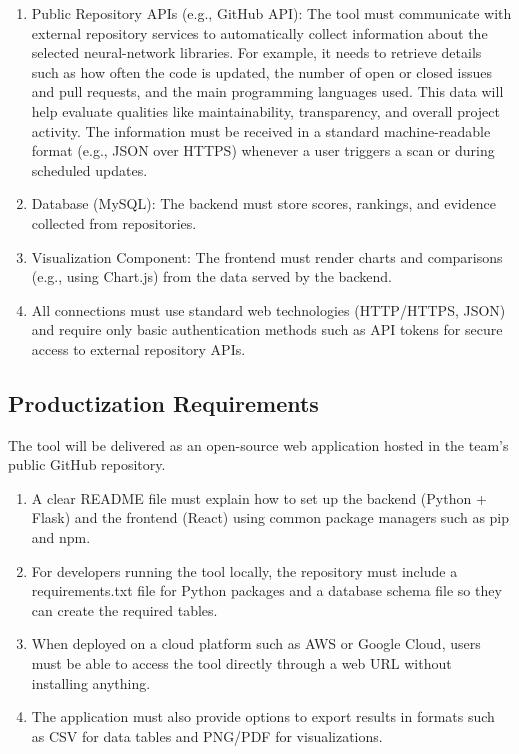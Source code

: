\documentclass[12pt]{article}
\begin{document}
\begin{enumerate}[label=OE-IA\arabic*]

  \item Public Repository APIs (e.g., GitHub API): The tool must communicate with external repository services to automatically collect information about the selected neural-network libraries. For example, it needs to retrieve details such as how often the code is updated, the number of open or closed issues and pull requests, and the main programming languages used. This data will help evaluate qualities like maintainability, transparency, and overall project activity. The information must be received in a standard machine-readable format (e.g., JSON over HTTPS) whenever a user triggers a scan or during scheduled updates.

  \item Database (MySQL): The backend must store scores, rankings, and evidence collected from repositories.

  \item Visualization Component: The frontend must render charts and comparisons (e.g., using Chart.js) from the data served by the backend.

  \item All connections must use standard web technologies (HTTP/HTTPS, JSON) and require only basic authentication methods such as API tokens for secure access to external repository APIs.

\end{enumerate}

\subsection{Productization Requirements}
The tool will be delivered as an open-source web application hosted in the team’s public GitHub repository.
\begin{enumerate}[label=OE-PR\arabic*]
\item A clear README file must explain how to set up the backend (Python + Flask) and the frontend (React) using common package managers such as pip and npm.
\item For developers running the tool locally, the repository must include a requirements.txt file for Python packages and a database schema file so they can create the required tables.
\item When deployed on a cloud platform such as AWS or Google Cloud, users must be able to access the tool directly through a web URL without installing anything.
\item The application must also provide options to export results in formats such as CSV for data tables and PNG/PDF for visualizations.
\end{enumerate}
\end{document}
